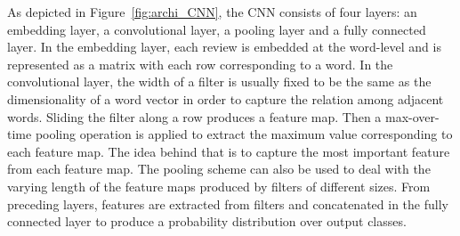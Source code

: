\documentclass[conference,compsoc]{IEEEtran}
\begin{document}
As depicted in Figure~\ref{fig:archi_CNN}, the CNN consists of four layers: an embedding layer, a convolutional layer, a pooling layer and a fully connected layer. In the embedding layer, each review is embedded at the word-level and is represented as a matrix with each row corresponding to a word. In the convolutional layer, the width of a filter is usually fixed to be the same as the dimensionality of a word vector in order to capture the relation among adjacent words.
Sliding the filter along a row produces a feature map. Then a max-over-time pooling operation is applied to extract the maximum value corresponding to each feature map. The idea behind that is to capture the most important feature from each feature map. The pooling scheme can also be used to deal with the varying length of the feature maps produced by filters of different sizes. From preceding layers, features are extracted from filters and concatenated in the fully connected layer to produce a probability distribution over output classes.
\end{document}
